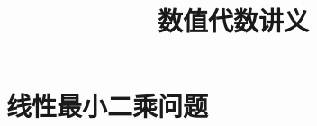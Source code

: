 \documentclass{book}
\begin{document}
\title{数值代数讲义}
\maketitle

\chapter{线性最小二乘问题}


\cite{stein2003}


\end{document}
